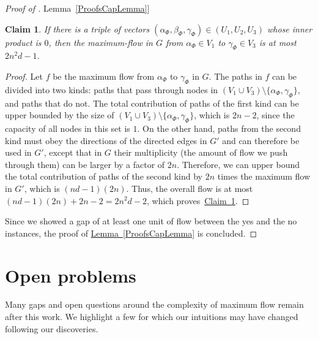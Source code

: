 \documentclass[11pt]{article}
\numberwithin{equation}{section}
\newtheorem{claim}[theorem]{Claim}
\theoremstyle{definition}
\theoremstyle{plain}
\newcommand{\expref}[2]{\hyperref[#2]{#1~\ref{#2}}}
\theoremstyle{plain}
\begin{document}
\begin{proof}[Proof of \expref{Lemma}{ProofsCapLemma}]
\begin{claim}\label{claim:second}
If there is a triple of vectors $(\alpha_{\Phi}, \beta_{\Phi}, \gamma_{\Phi})\in (U_1, U_2, U_3)$ whose inner product is $0$, then the maximum-flow in $G$ from $\alpha_{\Phi} \in V_1$ to $\gamma_{\Phi} \in V_3$ is at most $2n^2d -1$.
\end{claim}
\begin{proof}
Let $f$ be the maximum flow from $\alpha_{\Phi}$ to $\gamma_{\Phi}$ in $G$.
The paths in $f$ can be divided into two kinds: paths that pass through nodes in $(V_1\cup V_3)\setminus \{\alpha_{\Phi},\gamma_{\Phi}\}$, and paths that do not.
The total contribution of paths of the first kind can be upper bounded by the size of $(V_1\cup V_3)\setminus \{\alpha_{\Phi},\gamma_{\Phi}\}$, which is $2n-2$, since the capacity of all nodes in this set is $1$.
On the other hand, paths from the second kind must obey the directions of the directed edges in $G'$ and can therefore be used in $G'$, except that in $G$ their multiplicity (the amount of flow we push through them) can be larger by a factor of $2n$.
Therefore, we can upper bound the total contribution of paths of the second kind by $2n$ times the maximum flow in $G'$, which is $(nd-1)(2n)$.
Thus, the overall flow is at most $(nd-1)(2n)+2n-2=2n^2d-2$, which proves~\expref{Claim}{claim:second}.
\end{proof}
Since we showed a gap of at least one unit of flow between the yes and the no instances, the proof of \expref{Lemma}{ProofsCapLemma} is concluded.
\end{proof}



\section{Open problems}\label{Section:Conclusion}

Many gaps and open questions around the complexity of maximum flow remain after this work. We highlight a few for which our intuitions may have changed following our discoveries.
\end{document}
